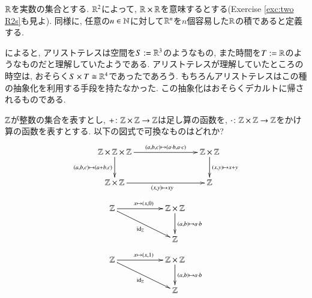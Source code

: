 \begin{example}\label{ex:R2}


${\mathbb R}$を実数の集合とする. ${\mathbb R}^2$によって, ${\mathbb R}\times{\mathbb R}$を意味するとする(Exercise \ref{exc:two R2s}も見よ). 同様に, 任意の$n\in{\mathbb N}$に対して${\mathbb R}^n$を$n$個容易した${\mathbb R}$の積であると定義する.


\cite{Pen}によると, アリストテレスは空間を$S:={\mathbb R}^3$のようなもの, また時間を$T:={\mathbb R}$のようなものだと理解していたようである. アリストテレスが理解していたところの時空は, おそらく$S\times T\cong{\mathbb R}^4$であったであろう. もちろんアリストテレスはこの種の抽象化を利用する手段を持たなかった. この抽象化はおそらくデカルトに帰されるものである.

\end{example}

\begin{exercise}

${\mathbb Z}$が整数の集合を表すとし, $+\colon{\mathbb Z}\times{\mathbb Z}\rightarrow{\mathbb Z}$は足し算の函数を, $\cdot\colon{\mathbb Z}\times{\mathbb Z}\rightarrow{\mathbb Z}$をかけ算の函数を表すとする. 以下の図式で可換なものはどれか?
\sexc $$\xymatrix{
\ZZ\times\ZZ\times\ZZ\ar[rr]^-{(a,b,c)\mapsto(a\cdot b,a\cdot c)}\ar[d]_{(a,b,c)\mapsto(a+b,c)}&\hsp&\ZZ\times\ZZ\ar[d]^{(x,y)\mapsto x+y}\\
\ZZ\times\ZZ\ar[rr]_{(x,y)\mapsto xy}&&\ZZ}
$$
\next $$
\xymatrix{
\ZZ\ar[rr]^{x\mapsto (x,0)}\ar[drr]_{\id_\ZZ}&&\ZZ\times\ZZ\ar[d]^{(a,b)\mapsto a\cdot b}\\&&\ZZ}
$$
\next$$
\xymatrix{
\ZZ\ar[rr]^{x\mapsto (x,1)}\ar[drr]_{\id_\ZZ}&&\ZZ\times\ZZ\ar[d]^{(a,b)\mapsto a\cdot b}\\&&\ZZ}
$$
\endsexc
\end{exercise}

